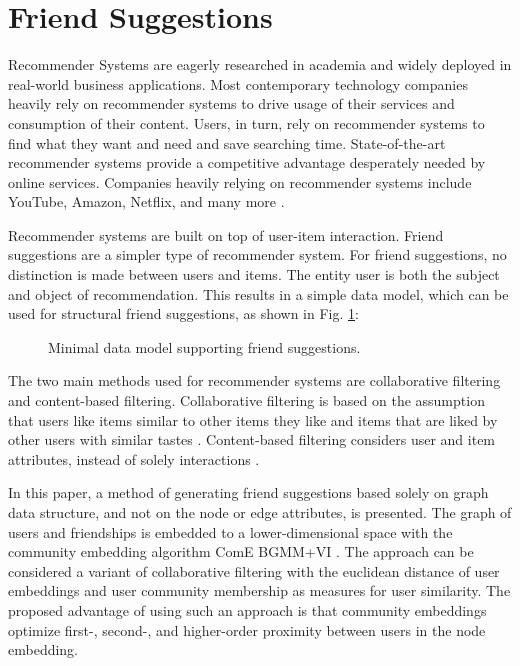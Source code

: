 \documentclass[conference]{IEEEtran}
\begin{document}
\section{Friend Suggestions}

Recommender Systems are eagerly researched in academia and widely deployed in real-world business applications. Most contemporary technology companies heavily rely on recommender systems to drive usage of their services and consumption of their content. Users, in turn, rely on recommender systems to find what they want and need and save searching time. State-of-the-art recommender systems provide a competitive advantage desperately needed by online services. Companies heavily relying on recommender systems include YouTube, Amazon, Netflix, and many more \cite{Rocca19}.

Recommender systems are built on top of user-item interaction. Friend suggestions are a simpler type of recommender system. For friend suggestions, no distinction is made between users and items. The entity user is both the subject and object of recommendation. This results in a simple data model, which can be used for structural friend suggestions, as shown in Fig. \ref{fig:data_model}:

\begin{figure}[H]
    \centering
    \caption{Minimal data model supporting friend suggestions.}
    \label{fig:data_model}
\end{figure}

The two main methods used for recommender systems are collaborative filtering and content-based filtering. Collaborative filtering is based on the assumption that users like items similar to other items they like and items that are liked by other users with similar tastes \cite{Grover17, Su2009ASO}. Content-based filtering considers user and item attributes, instead of solely interactions \cite{Rocca19, Lops2011SurveyCB}.

In this paper, a method of generating friend suggestions based solely on graph data structure, and not on the node or edge attributes, is presented. The graph of users and friendships is embedded to a lower-dimensional space with the community embedding algorithm ComE BGMM+VI \cite{ComE, ComE+, ComE_BGMM_GH}. The approach can be considered a variant of collaborative filtering with the euclidean distance of user embeddings and user community membership as measures for user similarity. The proposed advantage of using such an approach is that community embeddings optimize first-, second-, and higher-order proximity between users in the node embedding.
\end{document}
